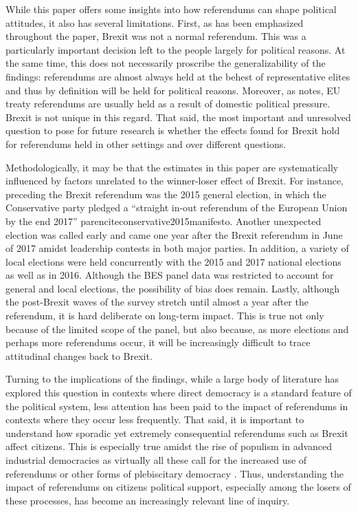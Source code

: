 \documentclass[12pt, letter]{article}
\begin{document}
While this paper offers some insights into how referendums can shape political attitudes, it also has several limitations. First, as has been emphasized throughout the paper, Brexit was not a normal referendum. This was a particularly important decision left to the people largely for political reasons. At the same time, this does not necessarily proscribe the generalizability of the findings: referendums are almost always held at the behest of representative elites and thus by definition will be held for political reasons. Moreover, as \textcite{prosser2016calling} notes, EU treaty referendums are usually held as a result of domestic political pressure. Brexit is not unique in this regard. That said, the most important and unresolved question to pose for future research is whether the effects found for Brexit hold for referendums held in other settings and over different questions.

Methodologically, it may be that the estimates in this paper are systematically influenced by factors unrelated to the winner-loser effect of Brexit. For instance, preceding the Brexit referendum was the 2015 general election, in which the Conservative party pledged a ``straight in-out referendum of the European Union by the end 2017'' parencite{conservative2015manifesto}. Another unexpected election was called early and came one year after the Brexit referendum in June of 2017 amidst leadership contests in both major parties. In addition, a variety of local elections were held concurrently with the 2015 and 2017 national elections as well as in 2016. Although the BES panel data was restricted to account for general and local elections, the possibility of bias does remain. Lastly, although the post-Brexit waves of the survey stretch until almost a year after the referendum, it is hard deliberate on long-term impact. This is true not only because of the limited scope of the panel, but also because, as more elections and perhaps more referendums occur, it will be increasingly difficult to trace attitudinal changes back to Brexit. 

Turning to the implications of the findings, while a large body of literature has explored this question in contexts where direct democracy is a standard feature of the political system, less attention has been paid to the impact of referendums in contexts where they occur less frequently. That said, it is important to understand how sporadic yet extremely consequential referendums such as Brexit affect citizens. This is especially true amidst the rise of populism in advanced industrial democracies as virtually all these call for the increased use of referendums or other forms of plebiscitary democracy \parencite{mudde2007populist}. Thus, understanding the impact of referendums on citizens political support, especially among the losers of these processes, has become an increasingly relevant line of inquiry.  
\end{document}
